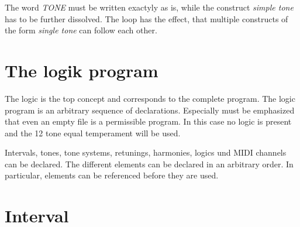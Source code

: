 

The word \textit{TONE} must be written exactyly as is, while the
construct \textit{simple tone} has to be further dissolved. The loop
has the effect, that multiple constructs of the form \textit{single
  tone} can follow each other.


\chapter{The  logik program}\label{cha:das-logikprogramm}
The logic is the top concept and corresponds to the complete
program. The logic program is an arbitrary sequence of
declarations. Especially must be emphasized that
even an empty file is a permissible program. In this case no logic is
present and the 12 tone equal temperament  will be used.
\iffalse
Das Logikprogramm ist der oberste Grammatikbegriff und entspricht
dem gesamten Programm. Das Logikprogramm selbst ist eine beliebige
Folge von Deklarationen\index{Deklarationen}.
Insbesondere ist hervorzuheben, daß auch
gar nichts, also ein leeres File, ein zulässiges Programm ist.
In diesem Fall ist keine Logik vorhanden und die normale
gleichstufig temperierte Stimmung eingestellt.
\fi

Intervals, tones, tone systems, retunings, harmonies, logics und MIDI
channels can be declared. The different elements can be declared in an
arbitrary order. In particular, elements can be referenced before they
are used.
\iffalse
Es können Intervalle, Töne, Tonsysteme, Umstimmungen, Harmonien,
Logiken und MIDI-Kanäle deklariert werden. Die einzelnen Elemente können
in beliebiger Reihenfolge deklariert werden. Insbesondere kann auf
Elemente Bezug genommen werden, die erst später deklariert werden.
\fi



\chapter{Interval}\label{cha:intervall}

